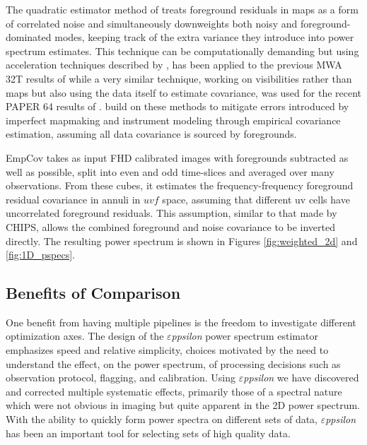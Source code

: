 \documentclass[twolcolumn,iop]{emulateapj}
\def\eppsilon{{\it $\varepsilon$ppsilon}}
\def\empirical{EmpCov}
\def\dilloncite{\cite{PhysRevD.91.123011} }
\begin{document}
The quadratic estimator method of \cite{Liu:2011p8763} treats foreground residuals in maps as a form of correlated noise and simultaneously downweights both noisy and foreground-dominated modes, keeping track of the extra variance they introduce into power spectrum estimates. This technique can be computationally demanding but using acceleration techniques described by \cite{Dillon:2013p10497}, has been applied to the previous MWA 32T results of \cite{Dillon:2014p9788} while a very similar technique, working on visibilities rather than maps but also using the data itself to estimate covariance, was used for the recent PAPER 64 results of \cite{2015ApJ...809...61A}.  \dilloncite{} build on these methods to mitigate errors introduced by imperfect mapmaking and instrument modeling through empirical covariance estimation, assuming all data covariance is sourced by foregrounds.

\empirical{} takes as input FHD calibrated images with foregrounds subtracted as well as possible, split into even and odd time-slices and averaged over many observations. From these cubes, it estimates the frequency-frequency foreground residual covariance in annuli in $uvf$ space, assuming that different uv cells have uncorrelated foreground residuals. This assumption, similar to that made by CHIPS, allows the combined foreground and noise covariance to be inverted directly. The resulting power spectrum is shown in Figures \ref{fig:weighted_2d} and \ref{fig:1D_pspecs}.  



\subsection{Benefits of Comparison}
\label{sec:benefits_of_comparison}


One benefit from having multiple pipelines is the freedom to investigate  different optimization axes.  The design of the \eppsilon{} power spectrum estimator emphasizes speed and relative simplicity, choices  motivated by the need to understand the effect, on the power spectrum, of processing decisions such as observation protocol, flagging, and calibration. Using \eppsilon{} we have discovered and corrected multiple systematic effects, primarily those of a spectral nature which were not obvious in imaging but quite apparent in the 2D power spectrum. With the ability to quickly form power spectra on different sets of data, \eppsilon{} has been an important tool for selecting sets of high quality data. 
\end{document}
